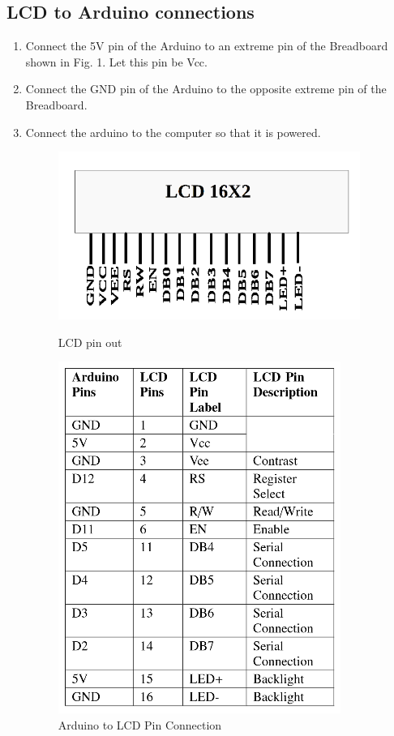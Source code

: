 \documentclass[11pt]{article}
\begin{document}
	\subsection{LCD to Arduino connections}
		\begin{enumerate}
		\item Connect the 5V pin of the Arduino to an extreme pin of the Breadboard shown in Fig. 1. Let this pin be Vcc.
		\item Connect the GND pin of the Arduino to the opposite extreme pin of the Breadboard.
		\item Connect the arduino to the computer so that it is powered.
\begin{figure}[h]
	\begin{minipage}[t]{.5\linewidth}
		\centering
		\vspace{-5.5cm}
		\includegraphics[scale=1]{lcd}
		\caption{ LCD pin out}
		\label{fig:1}
	\end{minipage}
  	\hspace{0.5cm}	
	\begin{minipage}[t]{.5\linewidth}
		\centering
		\includegraphics[scale=1]{lcd_connections}
		\caption{ Arduino to LCD Pin Connection}
		\label{fig:1}  
		\end{minipage}
\end{figure}
		

\end{enumerate}
\end{document}

